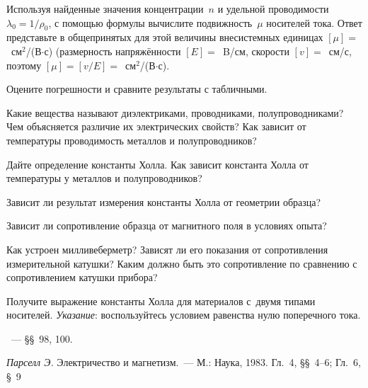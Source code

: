 \begin{lab:task}
\item Используя найденные значения концентрации~$n$ и удельной проводимости
$\lambda_0=1/\rho_0$, с помощью формулы  вычислите 
подвижность~$\mu$ носителей тока. Ответ представьте в общепринятых для этой величины 
внесистемных единицах $[\mu]=$~см$^2$/(В$\cdot$с)
(размерность напряжённости $[E]=$~B/см, скорости $[v]=$~см/с,
поэтому $[\mu]=[v/E]=$~см$^2$/(В$\cdot$с).

\item Оцените погрешности и сравните результаты с табличными.

\end{lab:task}


\begin{lab:questions}

\item Какие вещества называют диэлектриками, проводниками, полупроводниками?
Чем объясняется различие их электрических свойств? Как зависит от температуры
проводимость металлов и полупроводников?

\item Дайте определение константы Холла. Как зависит константа Холла от
температуры у металлов и полупроводников?

\item Зависит ли результат измерения константы Холла от геометрии образца?

\item Зависит ли сопротивление образца от магнитного поля 
в условиях опыта?

\item Как устроен милливеберметр? Зависят ли его показания от сопротивления
измерительной катушки? Каким должно быть это сопротивление по сравнению с
сопротивлением катушки прибора?

\item Получите выражение константы Холла для материалов с~двумя типами
носителей. \emph{Указание}: воспользуйтесь условием равенства нулю поперечного тока.

\end{lab:questions}


\begin{lab:literature}
\item \SivuhinIII~--- \S\S~98, 100.
\item \textit{Парселл Э.} Электричество и магнетизм.~--- М.: Наука, 1983. Гл.~4,
\S\S~4--6; Гл.~6, \S~9
\end{lab:literature}


